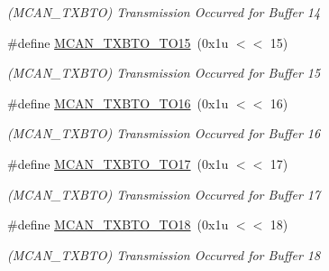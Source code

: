\begin{DoxyCompactItemize}
\begin{DoxyCompactList}\small\item\em (M\+C\+A\+N\+\_\+\+T\+X\+B\+TO) Transmission Occurred for Buffer 14 \end{DoxyCompactList}\item 
\mbox{\label{group__SAME70__MCAN_ga9dd9ccf58286d9fb598eaf60b5475cb4}} 
\#define \mbox{\hyperlink{group__SAME70__MCAN_ga9dd9ccf58286d9fb598eaf60b5475cb4}{M\+C\+A\+N\+\_\+\+T\+X\+B\+T\+O\+\_\+\+T\+O15}}~(0x1u $<$$<$ 15)
\begin{DoxyCompactList}\small\item\em (M\+C\+A\+N\+\_\+\+T\+X\+B\+TO) Transmission Occurred for Buffer 15 \end{DoxyCompactList}\item 
\mbox{\label{group__SAME70__MCAN_gaecedba64cdb0073292d2826427e41774}} 
\#define \mbox{\hyperlink{group__SAME70__MCAN_gaecedba64cdb0073292d2826427e41774}{M\+C\+A\+N\+\_\+\+T\+X\+B\+T\+O\+\_\+\+T\+O16}}~(0x1u $<$$<$ 16)
\begin{DoxyCompactList}\small\item\em (M\+C\+A\+N\+\_\+\+T\+X\+B\+TO) Transmission Occurred for Buffer 16 \end{DoxyCompactList}\item 
\mbox{\label{group__SAME70__MCAN_gafa8efd7dfe177c778d0db6995dd8e636}} 
\#define \mbox{\hyperlink{group__SAME70__MCAN_gafa8efd7dfe177c778d0db6995dd8e636}{M\+C\+A\+N\+\_\+\+T\+X\+B\+T\+O\+\_\+\+T\+O17}}~(0x1u $<$$<$ 17)
\begin{DoxyCompactList}\small\item\em (M\+C\+A\+N\+\_\+\+T\+X\+B\+TO) Transmission Occurred for Buffer 17 \end{DoxyCompactList}\item 
\mbox{\label{group__SAME70__MCAN_gafd5d72f41541d8c1af69069f6e0d8302}} 
\#define \mbox{\hyperlink{group__SAME70__MCAN_gafd5d72f41541d8c1af69069f6e0d8302}{M\+C\+A\+N\+\_\+\+T\+X\+B\+T\+O\+\_\+\+T\+O18}}~(0x1u $<$$<$ 18)
\begin{DoxyCompactList}\small\item\em (M\+C\+A\+N\+\_\+\+T\+X\+B\+TO) Transmission Occurred for Buffer 18 \end{DoxyCompactList}\item 

\end{DoxyCompactItemize}

